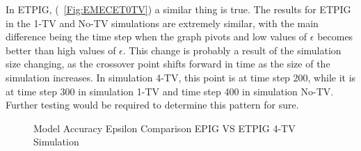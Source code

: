 \documentclass[12pt]{thesis}
\begin{document}
In ETPIG, (\figurename~\ref{Fig:EMECET0TV}) a similar thing is true. The results for ETPIG in the 1-TV and No-TV simulations are extremely similar, with the main difference being the time step when the graph pivots and low values of $\epsilon$ becomes better than high values of $\epsilon$. This change is probably a result of the simulation size changing, as the crossover point shifts forward in time as the size of the simulation increases. In simulation 4-TV, this point is at time step 200, while it is at time step 300 in simulation 1-TV and time step 400 in simulation No-TV. Further testing would be required to determine this pattern for sure.
\begin{figure}
	\begin{center}
		\hfill
		\hfill
	\end{center}
	\caption{Model Accuracy Epsilon Comparison EPIG VS ETPIG 4-TV Simulation}
	\label{Fig:EAEC4TV}
\end{figure}
\end{document}
